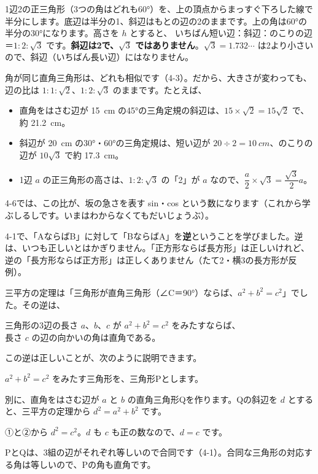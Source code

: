 1辺2の正三角形（3つの角はどれも60°）を、上の頂点からまっすぐ下ろした線で半分にします。底辺は半分の1、斜辺はもとの辺の2のままです。上の角は60°の半分の30°になります。高さを $h$ とすると、
いちばん短い辺：斜辺：のこりの辺＝$1:2:\sqrt3$ です。\textbf{斜辺は2で、$\sqrt3$ ではありません}。$\sqrt3=1.732\cdots$ は2より小さいので、斜辺（いちばん長い辺）にはなりません。

角が同じ直角三角形は、どれも相似です（4-3）。だから、大きさが変わっても、辺の比は $1:1:\sqrt2$、$1:2:\sqrt3$ のままです。たとえば、
\begin{itemize}[leftmargin=1.2\zw, itemsep=1pt, topsep=2pt, label={\color{\bkTT}●}]
\item 直角をはさむ辺が \qty{15}{cm} の45°の三角定規の斜辺は、$15\times\sqrt2=15\sqrt2$ で、約 \qty{21.2}{cm}。
\item 斜辺が \qty{20}{cm} の30°・60°の三角定規は、短い辺が $20\div2=\qty{10}{cm}$、のこりの辺が $10\sqrt3$ で約 \qty{17.3}{cm}。
\item 1辺 $a$ の正三角形の高さは、$1:2:\sqrt3$ の「2」が $a$ なので、$\dfrac{a}{2}\times\sqrt3=\dfrac{\sqrt3}{2}a$。
\end{itemize}
4-6では、この比が、坂の急さを表す sin・cos という数になります（これから学ぶしるしです。いまはわからなくてもだいじょうぶ）。

\label{bk:4-4:gyaku}4-1で、「AならばB」に対して「BならばA」を\textbf{逆}ということを学びました。逆は、いつも正しいとはかぎりません。「正方形ならば長方形」は正しいけれど、逆の「長方形ならば正方形」は正しくありません（たて2・横3の長方形が反例）。

三平方の定理は「三角形が直角三角形（∠C＝90°）ならば、$a^2+b^2=c^2$」でした。その逆は、
\begin{taisetsu}
三角形の3辺の長さ $a$、$b$、$c$ が $a^2+b^2=c^2$ をみたすならば、\\
長さ $c$ の辺の向かいの角は直角である。
\end{taisetsu}
\noindent この逆は正しいことが、次のように説明できます。
\begin{enumerate}[label={\bkcircled[bkOrange]{\arabic*}}, leftmargin=2.4\zw, itemsep=2pt, topsep=2pt]
\item $a^2+b^2=c^2$ をみたす三角形を、三角形Pとします。
\item 別に、直角をはさむ辺が $a$ と $b$ の直角三角形Qを作ります。Qの斜辺を $d$ とすると、三平方の定理から $d^2=a^2+b^2$ です。
\item ①と②から $d^2=c^2$。$d$ も $c$ も正の数なので、$d=c$ です。
\item PとQは、3組の辺がそれぞれ等しいので合同です（4-1）。合同な三角形の対応する角は等しいので、Pの角も直角です。
\end{enumerate}

